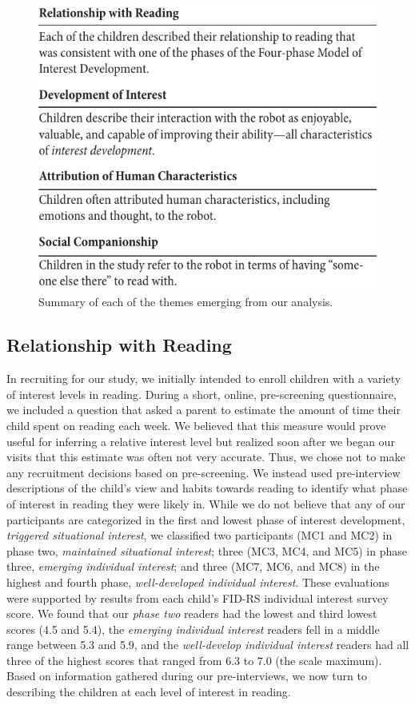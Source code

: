 \documentclass{sigchi}
\begin{document}
\begin{figure}[t]
	\centering
	\includegraphics[width=1\columnwidth]{figures/chi17-michaelis-figures-summary.pdf}
	\caption{Summary of each of the themes emerging from our analysis.}
	\label{fig:figure4}
\end{figure}

\subsection{Relationship with Reading}
In recruiting for our study, we initially intended to enroll children with a variety of interest levels in reading. During a short, online, pre-screening questionnaire, we included a question that asked a parent to estimate the amount of time their child spent on reading each week. We believed that this measure would prove useful for inferring a relative interest level but realized soon after we began our visits that this estimate was often not very accurate. Thus, we chose not to make any recruitment decisions based on pre-screening. We instead used pre-interview descriptions of the child's view and habits towards reading to identify what phase of interest in reading they were likely in. While we do not believe that any of our participants are categorized in the first and lowest phase of interest development, \textit{triggered situational interest}, we classified two participants (MC1 and MC2) in phase two, \textit{maintained situational interest}; three (MC3, MC4, and MC5) in phase three, \textit{emerging individual interest}; and three (MC7, MC6, and MC8) in the highest and fourth phase, \textit{well-developed individual interest}. These evaluations were supported by results from each child's FID-RS individual interest survey score. We found that our \textit{phase two} readers had the lowest and third lowest scores (4.5 and 5.4), the \textit{emerging individual interest} readers fell in a middle range between 5.3 and 5.9, and the \textit{well-develop individual interest} readers had all three of the highest scores that ranged from 6.3 to 7.0 (the scale maximum). Based on information gathered during our pre-interviews, we now turn to describing the children at each level of interest in reading. 
\end{document}
